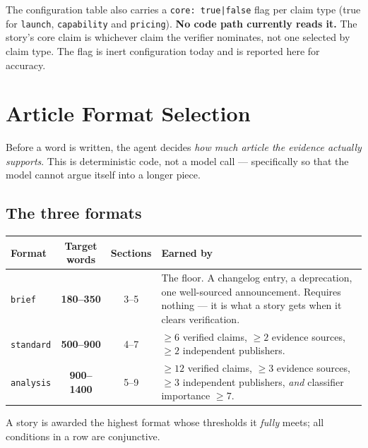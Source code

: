 \documentclass[11pt,a4paper]{article}
\newcommand{\brk}{\hyphenpenalty=0\exhyphenpenalty=0\relax}
\newcommand{\code}[1]{\texttt{\small\brk #1}}
\begin{document}
\begin{holdbox}
The configuration table also carries a \code{core: true|false} flag per claim type
(true for \code{launch}, \code{capability} and \code{pricing}). \textbf{No code
path currently reads it.} The story's core claim is whichever claim the verifier
nominates, not one selected by claim type. The flag is inert configuration today
and is reported here for accuracy.
\end{holdbox}

\section{Article Format Selection}

Before a word is written, the agent decides \emph{how much article the evidence
actually supports}. This is deterministic code, not a model call --- specifically
so that the model cannot argue itself into a longer piece.

\subsection{The three formats}

\begin{center}
\small
\begin{tabularx}{\textwidth}{@{}l c c >{\RaggedRight}X@{}}
\toprule
\textbf{Format} & \textbf{Target words} & \textbf{Sections} & \textbf{Earned by} \\
\midrule
\code{brief} & \textbf{180--350} & 3--5 &
  The floor. A changelog entry, a deprecation, one well-sourced announcement.
  Requires nothing --- it is what a story gets when it clears verification. \\
\code{standard} & \textbf{500--900} & 4--7 &
  $\geq 6$ verified claims, $\geq 2$ evidence sources, $\geq 2$ independent
  publishers. \\
\code{analysis} & \textbf{900--1400} & 5--9 &
  $\geq 12$ verified claims, $\geq 3$ evidence sources, $\geq 3$ independent
  publishers, \emph{and} classifier importance $\geq 7$. \\
\bottomrule
\end{tabularx}
\end{center}

A story is awarded the highest format whose thresholds it \emph{fully} meets; all
conditions in a row are conjunctive.
\end{document}
